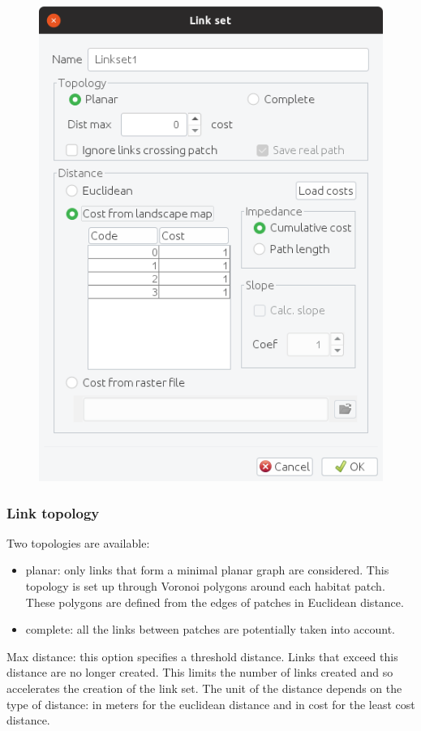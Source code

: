 \documentclass{article}
\begin{document}
\begin{figure}[H]
	\includegraphics[scale=0.5]{img/manual-en_linkset.png}
\end{figure}


\subsubsection{Link topology}

Two topologies are available: 

\begin{itemize}
	\item planar: only links that form a minimal planar graph are considered. This topology is set up through Voronoi polygons around each habitat patch. These polygons are defined from the edges of patches in Euclidean distance.
	\item complete: all the links between patches are potentially taken into account. 
\end{itemize}

Max distance: this option specifies a threshold distance. Links that exceed this distance are no longer created. This limits the number of links created and so accelerates the creation of the link set. The unit of the distance depends on the type of distance: in meters for the euclidean distance and in cost for the least cost distance.
\end{document}
